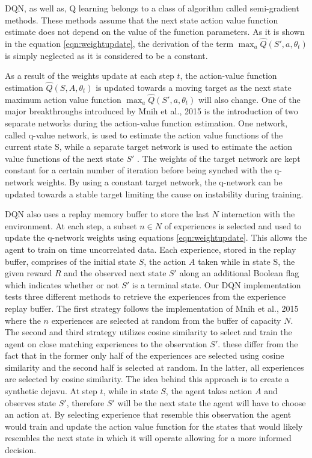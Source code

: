 \documentclass{article}
\begin{document}
DQN, as well as, Q learning belongs to a class of algorithm called semi-gradient methods. These methods assume that the next state action value function estimate does not depend on the value of the function parameters. As it is shown in the equation \ref{eqn:weightupdate}, the derivation of the term $\max_{a} \hat{Q}(S',a,\theta_{t}) $ is simply neglected as it is considered to be a constant.

As a result of the weights update at each step $t$, the action-value function estimation $\hat{Q}(S, A,\theta_{t})$ is updated towards a moving target as the next state maximum action value function $\max_{a} \hat{Q}(S',a,\theta_{t})$ will also change. One of the major breakthroughs introduced by Mnih et al., 2015 is the introduction of two separate networks during the action-value function estimation. One network, called q-value network, is used to estimate the action value functions of the current state S, while a separate target network is used to estimate the action value functions of the next state $S'$ . The weights of the target network are kept constant for a certain number of iteration before being synched with the q-network weights. By using a constant target network, the q-network can be updated towards a stable target limiting the cause on instability during training.

DQN also uses a replay memory buffer to store the last $N$ interaction with the environment. At each step, a subset $n \in N$ of experiences is selected and used to update the q-network weights using equations \ref{eqn:weightupdate}. This allows the agent to train on time uncorrelated data. Each experience, stored in the replay buffer, comprises of the initial state $S$, the action $A$ taken while in state S, the given reward $R$ and the  observed next state $S'$ along an additional Boolean flag which indicates whether or not $S'$ is a terminal state. Our DQN implementation tests three different methods to retrieve the experiences from the experience replay buffer. The first strategy follows the implementation of Mnih et al., 2015 where the $n$ experiences are selected at random from the buffer of capacity $N$. The second and third strategy utilizes cosine similarity to select and train the agent on  close matching experiences to the observation $S'$. these differ from the fact that in the former only half of the experiences are selected using cosine similarity and the second half is selected at random. In the latter, all experiences are selected by cosine similarity. The idea behind this approach is to create a synthetic dejavu. At step $t$, while in state $S$, the agent takes action $A$ and observes state $S'$, therefore $S'$ will be the next state the agent will have to choose an action at. By selecting experience that resemble this observation the agent would train and update the action value function for the states that would likely resembles the next state in which it will operate allowing for a more informed decision.
\end{document}
